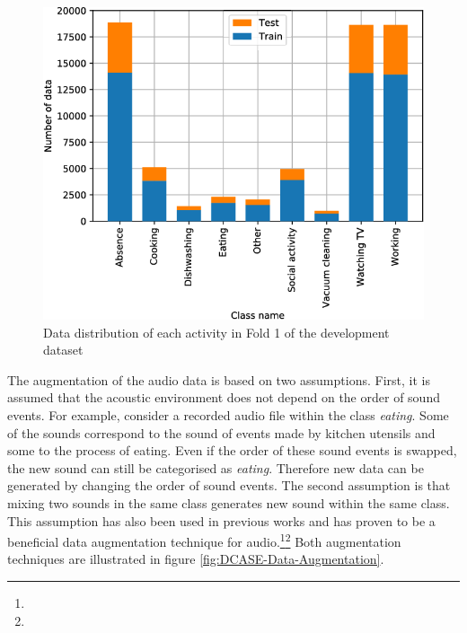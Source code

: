 \begin{figure}[htbp]
	\centering
	\includegraphics[scale=0.35]{baa-documentation/img/DCASE_unbalanced.png}
	\caption[Data distribution of each activity in Fold 1 of the development dataset]{Data distribution of each activity in Fold 1 of the development dataset \footnotemark}
	\label{fig:DCASE-Unbalanced}
\end{figure}
\noindent
\newline
\newline
The augmentation of the audio data is based on two assumptions. First, it is assumed that the acoustic environment does not depend on the order of sound events. For example, consider a recorded audio file within the class \textit{eating}. Some of the sounds correspond to the sound of events made by kitchen utensils and some to the process of eating. Even if the order of these sound events is swapped, the new sound can still be categorised as \textit{eating}. Therefore new data can be generated by changing the order of sound events. The second assumption is that mixing two sounds in the same class generates new sound within the same class. This assumption has also been used in previous works and has proven to be a beneficial data augmentation technique for audio.\footnote{}\footnote{} Both augmentation techniques are illustrated in figure \ref{fig:DCASE-Data-Augmentation}.
\newline
\newline
